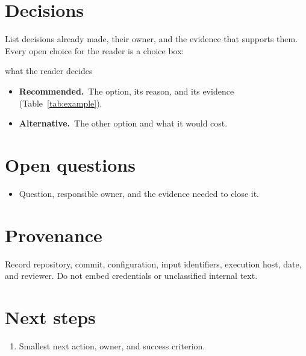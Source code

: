 \documentclass[11pt,a4paper]{article}
\newcommand{\recommended}{\textcolor{ctpBlue}{\textbf{Recommended.}}}
\newcommand{\alternative}{\textcolor{ctpMauve}{\textbf{Alternative.}}}
\begin{document}
\section{Decisions}

List decisions already made, their owner, and the evidence that supports them. Every open
choice for the reader is a choice box:

\begin{choice}{what the reader decides}
  \begin{itemize}
    \item \recommended\ The option, its reason, and its evidence (Table~\ref{tab:example}).
    \item \alternative\ The other option and what it would cost.
  \end{itemize}
\end{choice}

\section{Open questions}

\begin{itemize}
  \item Question, responsible owner, and the evidence needed to close it.
\end{itemize}

\section{Provenance}

Record repository, commit, configuration, input identifiers, execution host, date, and
reviewer. Do not embed credentials or unclassified internal text.

\section{Next steps}

\begin{enumerate}
  \item Smallest next action, owner, and success criterion.
\end{enumerate}

\printbibliography[heading=bibintoc,title={References}]
\end{document}
